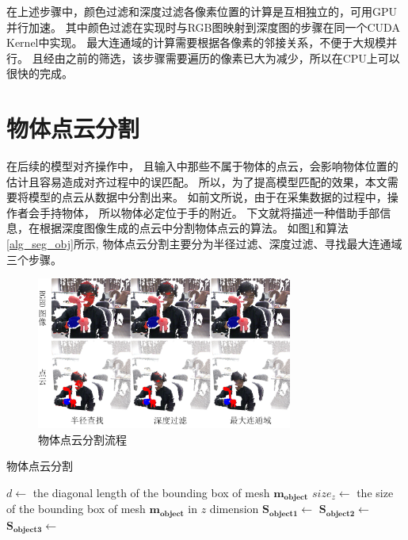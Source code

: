 在上述步骤中，颜色过滤和深度过滤各像素位置的计算是互相独立的，可用GPU并行加速。
其中颜色过滤在实现时与RGB图映射到深度图的步骤在同一个CUDA Kernel中实现。
最大连通域的计算需要根据各像素的邻接关系，不便于大规模并行。
且经由之前的筛选，该步骤需要遍历的像素已大为减少，所以在CPU上可以很快的完成。


\section{物体点云分割}
在后续的模型对齐操作中，
且输入中那些不属于物体的点云，会影响物体位置的估计且容易造成对齐过程中的误匹配。
所以，为了提高模型匹配的效果，本文需要将模型的点云从数据中分割出来。
如前文所说，由于在采集数据的过程中，操作者会手持物体，
所以物体必定位于手的附近。
下文就将描述一种借助手部信息，在根据深度图像生成的点云中分割物体点云的算法。
如图\ref{finding_object}和算法\ref{alg_seg_obj}所示,
物体点云分割主要分为半径过滤、深度过滤、寻找最大连通域三个步骤。
\begin{figure}[ht]
    \centering
    \includegraphics[width = 0.75\textwidth]{./Pictures/FindingObj.png}
    \caption{物体点云分割流程}
    \label{finding_object}
\end{figure}
\begin{algorithm}
    \caption{物体点云分割}
    \label{alg_seg_obj}
    \begin{algorithmic}[1]
            \State $d \gets$ the diagonal length of the bounding box of mesh $\bm{m_{object}}$
            \State $size_z \gets$ the size of the bounding box of mesh $\bm{m_{object}}$ in $z$ dimension
            \State $\bm{S_{object1}} \gets$ 
            \State $\bm{S_{object2}} \gets$ 
            \State $\bm{S_{object3}} \gets$ 
        \EndProcedure
    \end{algorithmic}
\end{algorithm} 

